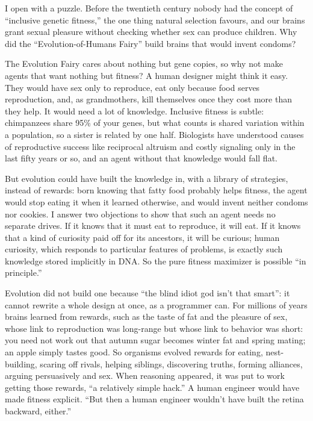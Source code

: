 
I open with a puzzle. Before the twentieth century nobody had the concept of ``inclusive genetic fitness,'' the one thing natural selection favours, and our brains grant sexual pleasure without checking whether sex can produce children. Why did the ``Evolution-of-Humans Fairy'' build brains that would invent condoms?

The Evolution Fairy cares about nothing but gene copies, so why not make agents that want nothing but fitness? A human designer might think it easy. They would have sex only to reproduce, eat only because food serves reproduction, and, as grandmothers, kill themselves once they cost more than they help. It would need a lot of knowledge. Inclusive fitness is subtle: chimpanzees share 95\% of your genes, but what counts is shared variation within a population, so a sister is related by one half. Biologists have understood causes of reproductive success like reciprocal altruism and costly signaling only in the last fifty years or so, and an agent without that knowledge would fall flat.

But evolution could have built the knowledge in, with a library of strategies, instead of rewards: born knowing that fatty food probably helps fitness, the agent would stop eating it when it learned otherwise, and would invent neither condoms nor cookies. I answer two objections to show that such an agent needs no separate drives. If it knows that it must eat to reproduce, it will eat. If it knows that a kind of curiosity paid off for its ancestors, it will be curious; human curiosity, which responds to particular features of problems, is exactly such knowledge stored implicitly in DNA. So the pure fitness maximizer is possible ``in principle.''

Evolution did not build one because ``the blind idiot god isn't that smart'': it cannot rewrite a whole design at once, as a programmer can. For millions of years brains learned from rewards, such as the taste of fat and the pleasure of sex, whose link to reproduction was long-range but whose link to behavior was short: you need not work out that autumn sugar becomes winter fat and spring mating; an apple simply tastes good. So organisms evolved rewards for eating, nest-building, scaring off rivals, helping siblings, discovering truths, forming alliances, arguing persuasively and sex. When reasoning appeared, it was put to work getting those rewards, ``a relatively simple hack.''  A human engineer would have made fitness explicit. ``But then a human engineer wouldn't have built the retina backward, either.''


